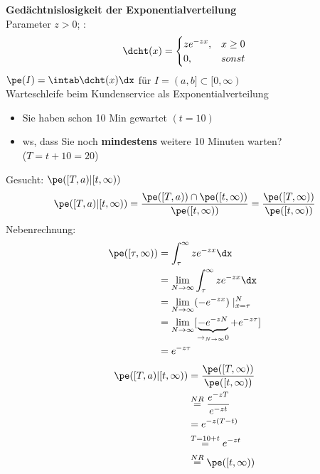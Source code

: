 \begin{bsp}
    \textbf{Gedächtnislosigkeit der Exponentialverteilung}   \\
    Parameter $z > 0$; \dichte:
    \[
        \dcht(x) = \begin{cases}
                       z e^{-zx}, & x \geq 0 \\ 0, & sonst
        \end{cases}
    \]
    $ \pe(I) = \intab \dcht(x) \dx $ für $I = (a,b] \subset [0,\infty)$ \\
    Warteschleife beim Kundenservice als Exponentialverteilung
    \begin{itemize}
        \item Sie haben schon 10 Min gewartet $(t=10)$
        \item \gls{ws}, dass Sie noch \textbf{mindestens} weitere 10 Minuten warten? \\ ($T=t+10=20$)
    \end{itemize}
    Gesucht: $\pe([T,a) | [t, \infty) )$
    \[
        \pe([T,a) | [t, \infty) ) = \frac{\pe([T,a)) \cap \pe([t, \infty) )}{\pe([t, \infty) )} =
        \frac{\pe([T, \infty) )}{\pe([t, \infty) )}
    \]
    Nebenrechnung:
    \begin{align*}
        \pe([\tau, \infty) ) &= \int_{\tau}^{\infty} z e^{-zx} \dx \\
        & = \lim_{N \rightarrow \infty } \int_{\tau}^{\infty} z e^{-zx} \dx \\
        & = \lim_{N \rightarrow \infty } ( - e^{-zx}) \mid_{x=\tau}^{N} \\
        & =\lim_{N \rightarrow \infty } [ \underbrace{- e^{-zN}}_{\rightarrow_{N \rightarrow \infty} 0} + e^{-z\tau} ]  \\
        & = e^{-z\tau}
    \end{align*}
    \begin{align*}
        \pe([T,a) | [t, \infty) ) & = \frac{\pe([T, \infty) )}{\pe([t, \infty) )} \\
        & \overset{NR}{=} \frac{e^{-zT}}{e^{-zt}} \\
        & = e^{-z(T-t)} \\
        & \overset{T=10+t}{=} e^{-zt} \\
        & \overset{NR}{=} \pe([t,\infty))
    \end{align*}
\end{bsp}


